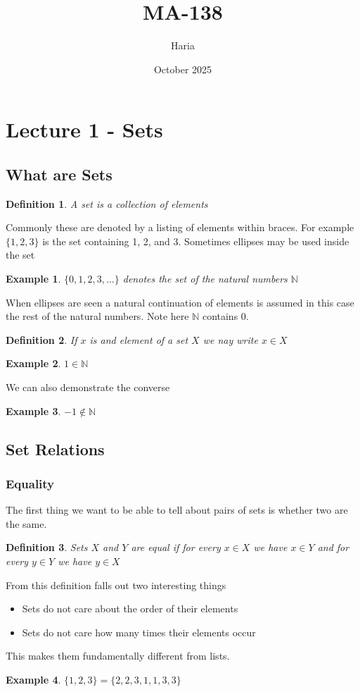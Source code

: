 \documentclass{article}
\title{MA-138}
\author{Haria}
\date{October 2025}
\begin{document}
\maketitle

\section{Lecture 1 - Sets}
\newtheorem{definition}{Definition}
\newtheorem{example}{Example}
\subsection{What are Sets}
\begin{definition}
A set is a collection of elements
\end{definition}
Commonly these are denoted by a listing of elements within braces. For example $\{1,2,3\}$ is the set containing 1, 2, and 3. Sometimes ellipses may be used inside the set
\begin{example}
    $\{0,1,2,3,\dots\}$ denotes the set of the natural numbers $\mathbb{N}$
\end{example}
When ellipses are seen a natural continuation of elements is assumed in this case the rest of the natural numbers. Note here $\mathbb{N}$ contains $0$.

\begin{definition}
    If $x$ is and element of a set $X$ we nay write $x \in X$
\end{definition}
\begin{example}
    $1 \in \mathbb{N}$
\end{example}
We can also demonstrate the converse
\begin{example}
    $-1 \notin \mathbb{N}$
\end{example}
\subsection{Set Relations}
\subsubsection{Equality}
The first thing we want to be able to tell about pairs of sets is whether two are the same.
\begin{definition}
    Sets $X$ and $Y$ are equal if for every $x \in X$ we have $x \in Y$ and for every $y \in Y$ we have $y \in X$
\end{definition}
From this definition falls out two interesting things
\begin{itemize}
    \item Sets do not care about the order of their elements
    \item Sets do not care how many times their elements occur
\end{itemize}
This makes them fundamentally different from lists.
\begin{example}
    $\{1,2,3\} = \{2,2,3,1,1,3,3\}$
\end{example}
\end{document}

